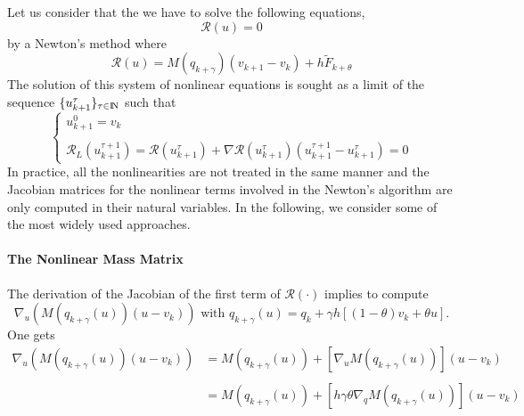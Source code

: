  Let us consider that the we have to solve the following equations,
\begin{equation}
  \label{eq:NL4}
  \mathcal R (u) = 0 
\end{equation}
by a Newton's method where
\begin{equation}
  \label{eq:NL6}
    \mathcal R (u) =   M(q_{k+\gamma} ) (v_{k+1}-v_{k}) + h \tilde F_{k+\theta}
\end{equation}
 The solution of this system of nonlinear equations is sought as a limit of the sequence $\{ u^{\tau}_{k+1}\}_{\tau \in \mathrm{I\!N}}$ such that
 \begin{equation}
   \label{eq:NL7}
   \begin{cases}
     u^{0}_{k+1} = v_k \\ \\
     \mathcal R_L( u^{\tau+1}_{k+1}) =  \mathcal R (u^{\tau}_{k+1}) + \nabla \mathcal R (u^{\tau}_{k+1} )(u^{\tau+1}_{k+1}-u^{\tau}_{k+1} ) =0
 \end{cases}
\end{equation}
 In practice, all the nonlinearities are not treated in the same manner and the Jacobian matrices for the nonlinear terms involved in the Newton's algorithm are only computed in their natural variables. In the following, we consider some of the most widely used approaches.



\paragraph{The Nonlinear Mass Matrix}
The derivation of the Jacobian of the first term of  $\mathcal R (\cdot)$ implies to compute
\begin{equation}
  \label{eq:NL2000}
   \nabla_u  \left(M(q_{k+\gamma}(u) ) (u-v_{k})\right) \text{ with } q_{k+\gamma}(u) = q_k + \gamma h[(1-\theta) v_k+ \theta u].
\end{equation}
One gets
\begin{equation}
  \label{eq:NL8}
  \begin{array}{ll}
    \nabla_u  \left(M(q_{k+\gamma}(u) ) (u-v_{k})\right) &=   M(q_{k+\gamma}(u))  + \left[ \nabla_u M(q_{k+\gamma}(u) ) \right] (u-v_{k}) \\ \\
                                         &=    M(q_{k+\gamma}(u)) + \left[h \gamma\theta \nabla_{q} M(q_{k+\gamma}(u))\right]  (u-v_{k}) 
\end{array}
\end{equation}


